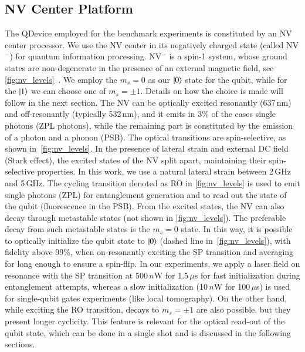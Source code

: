 \subsection{NV Center Platform}
\label{sec:qdevice-nv}

The \ac{QDevice} employed for the benchmark experiments is constituted by an \ac{NV} center processor. We use the \ac{NV} center in its negatively charged state (called \ac{NV}$^-$) for quantum information processing. \ac{NV}$^-$ is a spin-1 system, whose ground states are non-degenerate in the presence of an external magnetic field, see \cref{fig:nv_levels}~\cite{doherty_2013}. We employ the $m_s=0$ as our $\ket{0}$ state for the qubit, while for the $\ket{1}$ we can choose one of $m_s=\pm 1$. Details on how the choice is made will follow in the next section. The \ac{NV} can be optically excited resonantly (637\,nm) and off-resonantly (typically 532\,nm), and it emits in 3\% of the cases single photons (\ac{ZPL} photons), while the remaining part is constituted by the emission of a photon and a phonon (\ac{PSB}). The optical transitions are spin-selective, as shown in~\cref{fig:nv_levels}. In the presence of lateral strain and external DC field (Stark effect), the excited states of the \ac{NV} split apart, maintaining their spin-selective properties. In this work, we use a natural lateral strain between 2\,GHz and 5\,GHz. The cycling transition denoted as \ac{RO} in \cref{fig:nv_levels} is used to emit single photons (\ac{ZPL}) for entanglement generation and to read out the state of the qubit (fluorescence in the \ac{PSB}). From the excited states, the \ac{NV} can also decay through metastable states (not shown in \cref{fig:nv_levels}). The preferable decay from such metastable states is the $m_s=0$ state. In this way, it is possible to optically initialize the qubit state to $\ket{0}$ (dashed line in~\cref{fig:nv_levels}), with fidelity above 99\%, when on-resonantly exciting the \ac{SP} transition and averaging for long enough to ensure a spin-flip. In our experiments, we apply a laser field on resonance with the \ac{SP} transition at 500\,$n$W for 1.5\,$\mu$s for fast initialization during entanglement attempts, whereas a slow initialization (10\,$n$W for 100\,$\mu$s) is used for single-qubit gates experiments (like local tomography). On the other hand, while exciting the \ac{RO} transition, decays to $m_s=\pm 1$ are also possible, but they present longer cyclicity. This feature is relevant for the optical read-out of the qubit state, which can be done in a single shot and is discussed in the following sections.


